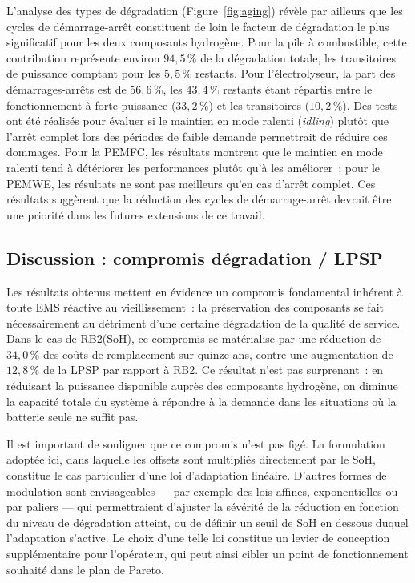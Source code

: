 L'analyse des types de dégradation (Figure~\ref{fig:aging}) révèle par ailleurs que les cycles de démarrage-arrêt constituent de loin le facteur de dégradation le plus significatif pour les deux composants hydrogène. Pour la pile à combustible, cette contribution représente environ $94{,}5\,\%$ de la dégradation totale, les transitoires de puissance comptant pour les $5{,}5\,\%$ restants. Pour l'électrolyseur, la part des démarrages-arrêts est de $56{,}6\,\%$, les $43{,}4\,\%$ restants étant répartis entre le fonctionnement à forte puissance ($33{,}2\,\%$) et les transitoires ($10{,}2\,\%$). Des tests ont été réalisés pour évaluer si le maintien en mode ralenti (\textit{idling}) plutôt que l'arrêt complet lors des périodes de faible demande permettrait de réduire ces dommages. Pour la PEMFC, les résultats montrent que le maintien en mode ralenti tend à détériorer les performances plutôt qu'à les améliorer~; pour le PEMWE, les résultats ne sont pas meilleurs qu'en cas d'arrêt complet. Ces résultats suggèrent que la réduction des cycles de démarrage-arrêt devrait être une priorité dans les futures extensions de ce travail.

\subsection{Discussion : compromis dégradation / LPSP}

Les résultats obtenus mettent en évidence un compromis fondamental inhérent à toute EMS réactive au vieillissement~: la préservation des composants se fait nécessairement au détriment d'une certaine dégradation de la qualité de service. Dans le cas de RB2(SoH), ce compromis se matérialise par une réduction de $34{,}0\,\%$ des coûts de remplacement sur quinze ans, contre une augmentation de $12{,}8\,\%$ de la LPSP par rapport à RB2. Ce résultat n'est pas surprenant~: en réduisant la puissance disponible auprès des composants hydrogène, on diminue la capacité totale du système à répondre à la demande dans les situations où la batterie seule ne suffit pas.

Il est important de souligner que ce compromis n'est pas figé. La formulation adoptée ici, dans laquelle les offsets sont multipliés directement par le SoH, constitue le cas particulier d'une loi d'adaptation linéaire. D'autres formes de modulation sont envisageables — par exemple des lois affines, exponentielles ou par paliers — qui permettraient d'ajuster la sévérité de la réduction en fonction du niveau de dégradation atteint, ou de définir un seuil de SoH en dessous duquel l'adaptation s'active. Le choix d'une telle loi constitue un levier de conception supplémentaire pour l'opérateur, qui peut ainsi cibler un point de fonctionnement souhaité dans le plan de Pareto.

